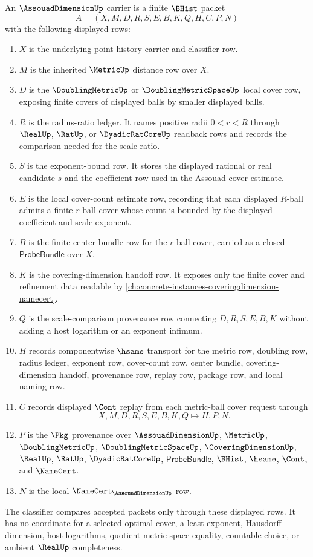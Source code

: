 \begin{definition}
\label{def:assouad-dimension-carrier}
An $\AssouadDimensionUp$ carrier is a finite $\BHist$ packet
$$
A=(X,M,D,R,S,E,B,K,Q,H,C,P,N)
$$
with the following displayed rows:
\begin{enumerate}
\item $X$ is the underlying point-history carrier and classifier row.
\item $M$ is the inherited $\MetricUp$ distance row over $X$.
\item $D$ is the $\DoublingMetricUp$ or $\DoublingMetricSpaceUp$ local cover row, exposing finite covers of displayed balls by smaller displayed balls.
\item $R$ is the radius-ratio ledger. It names positive radii $0<r<R$ through $\RealUp$, $\RatUp$, or $\DyadicRatCoreUp$ readback rows and records the comparison needed for the scale ratio.
\item $S$ is the exponent-bound row. It stores the displayed rational or real candidate $s$ and the coefficient row used in the Assouad cover estimate.
\item $E$ is the local cover-count estimate row, recording that each displayed $R$-ball admits a finite $r$-ball cover whose count is bounded by the displayed coefficient and scale exponent.
\item $B$ is the finite center-bundle row for the $r$-ball cover, carried as a closed $\mathsf{ProbeBundle}$ over $X$.
\item $K$ is the covering-dimension handoff row. It exposes only the finite cover and refinement data readable by \autoref{ch:concrete-instances-coveringdimension-namecert}.
\item $Q$ is the scale-comparison provenance row connecting $D,R,S,E,B,K$ without adding a host logarithm or an exponent infimum.
\item $H$ records componentwise $\hsame$ transport for the metric row, doubling row, radius ledger, exponent row, cover-count row, center bundle, covering-dimension handoff, provenance row, replay row, package row, and local naming row.
\item $C$ records displayed $\Cont$ replay from each metric-ball cover request through
$$
X,M,D,R,S,E,B,K,Q \longmapsto H,P,N .
$$
\item $P$ is the $\Pkg$ provenance over $\AssouadDimensionUp$, $\MetricUp$, $\DoublingMetricUp$, $\DoublingMetricSpaceUp$, $\CoveringDimensionUp$, $\RealUp$, $\RatUp$, $\DyadicRatCoreUp$, $\mathsf{ProbeBundle}$, $\BHist$, $\hsame$, $\Cont$, and $\NameCert$.
\item $N$ is the local $\NameCert_{\AssouadDimensionUp}$ row.
\end{enumerate}
The classifier compares accepted packets only through these displayed rows. It has no coordinate for a selected optimal cover, a least exponent, Hausdorff dimension, host logarithms, quotient metric-space equality, countable choice, or ambient $\RealUp$ completeness.
\end{definition}

